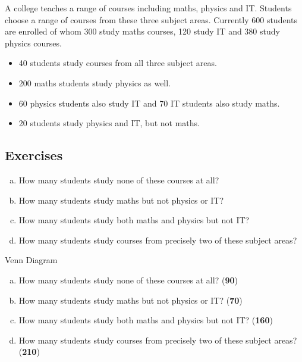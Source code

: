 \documentclass[a4paper,12pt]{article}
\begin{document}
\large 
\noindent A college teaches a range of courses including maths, physics and IT.
Students choose a range of courses from these three subject areas. Currently 600
students are enrolled of whom 300 study maths courses, 120 study IT
and 380 study physics courses. 

\begin{itemize}
\item 40 students study courses from all three subject
areas. 
\item 200 maths students study physics as well. 
\item 60 physics students
also study IT and 70 IT students also study maths. 
\item 20 students study physics and IT, but not maths.
\end{itemize}

\subsection*{Exercises}

\begin{enumerate}[(a)]
\item How many students study none of these courses at all? 

\item How many students study maths but not physics or IT? 

\item How many students study both maths and physics but not IT? 

\item How many students study courses from precisely two of these subject
areas? 
\end{enumerate}


\newpage
Venn Diagram
\newpage 
\begin{enumerate}[(a)]
\item How many students study none of these courses at all? (\textbf{90})

\item How many students study maths but not physics or IT? (\textbf{70})

\item How many students study both maths and physics but not IT? (\textbf{160})

\item How many students study courses from precisely two of these subject
areas? (\textbf{210})
\end{enumerate}
\end{document}
